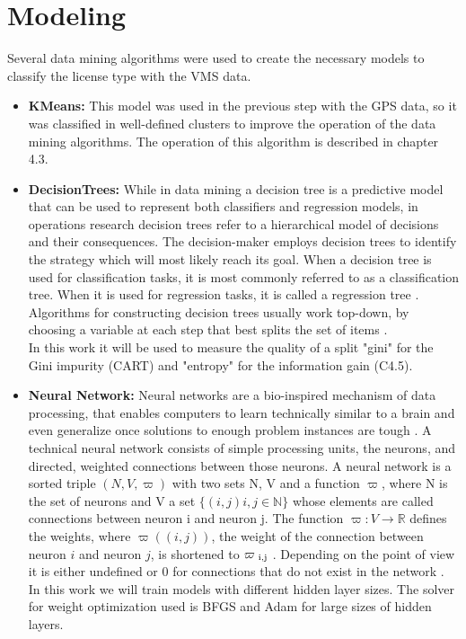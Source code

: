 \section{Modeling} %
\label{sub:modeling}
Several data mining algorithms were used to create the necessary models to classify the license type with the VMS data.
\begin{itemize}
\item \textbf{ KMeans:} This model was used in the previous step with the GPS data, so it was classified in well-defined clusters to improve the operation of the data mining algorithms. The operation of this algorithm is described in chapter 4.3.

\item \textbf{ DecisionTrees: }
While in data mining a decision tree is a predictive model that can be used to represent both classifiers and regression models, in operations research decision trees refer to a hierarchical model of decisions and their consequences. The decision-maker employs decision trees to identify the strategy which will most likely reach its goal. When a decision tree is used for classification tasks, it is most commonly referred to as a classification tree. When it is used for regression tasks, it is called a regression tree \cite{Rokach2014}.
Algorithms for constructing decision trees usually work top-down, by choosing a variable at each step that best splits the set of items \cite{ApplicationsReviews}.\\
In this work it will be used to measure the quality of a split "gini" for the Gini impurity (CART)\cite{DTAnalysis} and "entropy" for the information gain (C4.5)\cite{DTAnalysis}.

\item \textbf{Neural Network: }
Neural networks are a bio-inspired mechanism of data processing, that enables computers to learn technically similar to a brain and even generalize once solutions to enough problem instances are tough \cite{Kriesel2007NeuralNetworks}. A technical neural network consists of simple processing units, the neurons, and directed, weighted connections between those neurons. A neural network is a sorted triple $(N, V, \varpi )$ with two sets N, V and a  function $\varpi$, where N is the set of neurons and V a set $\{ (i, j) i, j \in \mathbb{N} \}$  whose elements are called connections between neuron i and neuron j. The function $ \varpi : V \rightarrow \mathbb{R}$ defines the weights, where $\varpi((i, j))$, the weight of the connection between neuron $i$ and neuron $j$, is shortened to $\varpi \textsubscript{ i,j}$ . Depending on the point of view it is either undefined or 0 for connections that do not exist in the network \cite{Kriesel2007NeuralNetworks}.  \\
In this work we will train models with different hidden layer sizes. The solver for weight optimization used is BFGS\cite{Dai2013} and Adam\cite{adamNN} for large sizes of hidden layers.


\end{itemize}

